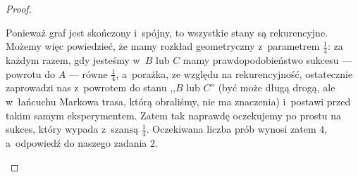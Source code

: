 \begin{proof}
\begin{enumerate}[label=(\roman*)]
            Ponieważ graf jest skończony i~spójny, to wszystkie stany są rekurencyjne. Możemy więc powiedzieć, że mamy rozkład geometryczny z~parametrem \(\frac{1}{4}\): za każdym razem, gdy jesteśmy w~\(B\) lub \(C\) mamy prawdopodobieństwo sukcesu --- powrotu do \(A\) --- równe \(\frac{1}{4}\), a~porażka, ze względu na rekurencyjność, ostatecznie zaprowadzi nas z~powrotem do stanu ,,\(B\) lub \(C\)'' (być może długą drogą, ale w~łańcuchu Markowa trasa, którą obraliśmy, nie ma znaczenia) i~postawi przed takim samym eksperymentem. Zatem tak naprawdę oczekujemy po prostu na sukces, który wypada z~szansą \(\frac{1}{4}\). Oczekiwana liczba prób wynosi zatem \(4\), a~odpowiedź do naszego zadania \(2\).
    \end{enumerate}
\end{proof}
